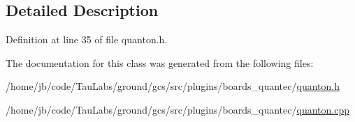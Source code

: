 \subsection{\-Detailed \-Description}


\-Definition at line 35 of file quanton.\-h.



\-The documentation for this class was generated from the following files\-:\begin{DoxyCompactItemize}
\item 
/home/jb/code/\-Tau\-Labs/ground/gcs/src/plugins/boards\-\_\-quantec/\hyperlink{quanton_8h}{quanton.\-h}\item 
/home/jb/code/\-Tau\-Labs/ground/gcs/src/plugins/boards\-\_\-quantec/\hyperlink{quanton_8cpp}{quanton.\-cpp}\end{DoxyCompactItemize}
